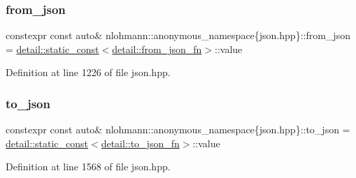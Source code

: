 \subsubsection{\texorpdfstring{from\+\_\+json}{from\_json}}
{\footnotesize\ttfamily constexpr const auto\& nlohmann\+::anonymous\+\_\+namespace\{json.\+hpp\}\+::from\+\_\+json = \hyperlink{structnlohmann_1_1detail_1_1static__const}{detail\+::static\+\_\+const}$<$\hyperlink{structnlohmann_1_1detail_1_1from__json__fn}{detail\+::from\+\_\+json\+\_\+fn}$>$\+::value}



Definition at line 1226 of file json.\+hpp.

\mbox{\label{namespacenlohmann_1_1anonymous__namespace_02json_8hpp_03_a455d0daa616e67bbb74d81cf3ba15e79}} 
\subsubsection{\texorpdfstring{to\+\_\+json}{to\_json}}
{\footnotesize\ttfamily constexpr const auto\& nlohmann\+::anonymous\+\_\+namespace\{json.\+hpp\}\+::to\+\_\+json = \hyperlink{structnlohmann_1_1detail_1_1static__const}{detail\+::static\+\_\+const}$<$\hyperlink{structnlohmann_1_1detail_1_1to__json__fn}{detail\+::to\+\_\+json\+\_\+fn}$>$\+::value}



Definition at line 1568 of file json.\+hpp.

